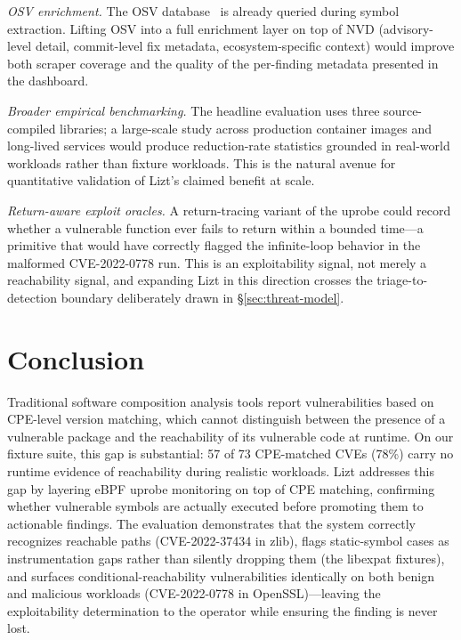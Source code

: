 \documentclass[conference]{IEEEtran}
\begin{document}
\emph{OSV enrichment.} The OSV database~\cite{osv} is already queried during symbol extraction.
Lifting OSV into a full enrichment layer on top of NVD (advisory-level detail, commit-level fix metadata, ecosystem-specific context) would improve both scraper coverage and the quality of the per-finding metadata presented in the dashboard.

\emph{Broader empirical benchmarking.} The headline evaluation uses three source-compiled libraries; a large-scale study across production container images and long-lived services would produce reduction-rate statistics grounded in real-world workloads rather than fixture workloads.
This is the natural avenue for quantitative validation of Lizt's claimed benefit at scale.

\emph{Return-aware exploit oracles.} A return-tracing variant of the uprobe could record whether a vulnerable function ever fails to return within a bounded time---a primitive that would have correctly flagged the infinite-loop behavior in the malformed CVE-2022-0778 run.
This is an exploitability signal, not merely a reachability signal, and expanding Lizt in this direction crosses the triage-to-detection boundary deliberately drawn in \S\ref{sec:threat-model}.


\section{Conclusion}

Traditional software composition analysis tools report vulnerabilities based on CPE-level version matching, which cannot distinguish between the presence of a vulnerable package and the reachability of its vulnerable code at runtime.
On our fixture suite, this gap is substantial: 57 of 73 CPE-matched CVEs (78\%) carry no runtime evidence of reachability during realistic workloads.
Lizt addresses this gap by layering eBPF uprobe monitoring on top of CPE matching, confirming whether vulnerable symbols are actually executed before promoting them to actionable findings.
The evaluation demonstrates that the system correctly recognizes reachable paths (CVE-2022-37434 in zlib), flags static-symbol cases as instrumentation gaps rather than silently dropping them (the libexpat fixtures), and surfaces conditional-reachability vulnerabilities identically on both benign and malicious workloads (CVE-2022-0778 in OpenSSL)---leaving the exploitability determination to the operator while ensuring the finding is never lost.
\end{document}

